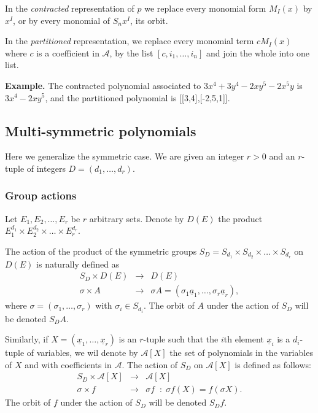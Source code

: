 \documentclass[11pt]{article}
\begin{document}
In the \emph{contracted} representation of $p$ we replace every monomial form
$M_I(x)$ by $x^I$, or by every monomial of $S_nx^I$, its orbit.

In the \emph{partitioned} representation, we replace every monomial term
$cM_I(x)$ where $c$ is a coefficient in $\mathcal{A}$, by the list
$[c,i_1,\ldots ,i_n]$ and join the whole into one list.

\textbf{Example.} The contracted polynomial associated to $3x^4 + 3y^4 - 2xy^5 -
2x^5y$ is $3x^4 -2xy^5$, and the partitioned polynomial is [[3,4],[-2,5,1]].



\subsection{Multi-symmetric polynomials}

Here we generalize the symmetric case. We are given an integer $r>0$ and an
$r$-tuple of integers $D=(d_1, \ldots ,d_r)$.

\subsubsection{Group actions}

Let $E_1, E_2, \ldots ,E_r$ be $r$ arbitrary sets.  Denote by $D(E)$ the product
$E_1^{d_1}\times E_2^{d_2}\times \ldots \times E_r^{d_r}$.

The action of the product of the symmetric groups $S_D=S_{d_1}\times S_{d_2}
\times \ldots \times S_{d_r}$ on $D(E)$ is naturally defined as
\begin{eqnarray*}
  S_D \times D(E)  & \longrightarrow & D(E) \\
  \sigma \times A  & \longrightarrow &
  \sigma A=(\sigma_1{\underline a}_1,\ldots ,\sigma_r{\underline a}_r),
\end{eqnarray*}
where $\sigma = (\sigma_1,\ldots ,\sigma_r)$ with $\sigma_i \in S_{d_i}$.  The
orbit of $A$ under the action of $S_D$ will be denoted $S_DA$.

Similarly, if $X=({\underline x}_1, \ldots,{\underline x}_r)$ is an $r$-tuple
such that the $i$th element ${\underline x}_i$ is a $d_i$-tuple of variables, we
wil denote by $\mathcal{A}[X]$ the set of polynomials in the variables of $X$
and with coefficients in $\mathcal{A}$.  The action of $S_D$ on $\mathcal{A}[X]$
is defined as follows:
\begin{eqnarray*}
  S_D \times \mathcal{A}[X] & \longrightarrow & \mathcal{A}[X]\\
  \sigma \times f  & \longrightarrow & \sigma f \;\; :\;
  \sigma f(X)= f(\sigma X).
\end{eqnarray*}
The orbit of $f$ under the action of $S_D$ will be denoted $S_Df$.
\end{document}
